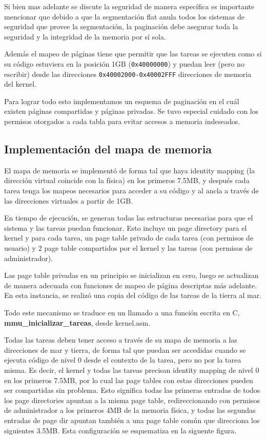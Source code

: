 	Si bien mas adelante se discute la seguridad de manera específica 
es importante mencionar que debido a que la segmentación flat anula 
todos los sistemas de seguridad que provee la segmentación, la paginación debe asegurar 
toda la seguridad y la integridad de la memoria por sí sola.

	Además el mapeo de páginas tiene que permitir que las tareas
se ejecuten como si su código estuviera en la posición 1GB (\texttt{0x40000000})
y puedan leer (pero no escribir) desde las direcciones \texttt{0x40002000-0x40002FFF}
direcciones de memoria del kernel.

	Para lograr todo esto implementamos un esquema de paginación en el cuál
existen páginas compartidas y páginas privadas. Se tuvo especial
cuidado con los permisos otorgados a cada tabla para evitar accesos a memoria
indeseados.

\subsection{Implementación del mapa de memoria}
	
	El mapa de memoria se implementó de forma tal que haya identity mapping 
(la dirección virtual coincide con la física) en los primeros 7.5MB, y después 
cada tarea tenga los mapeos necesarios para acceder a su código y al ancla a través
de las direcciones virtuales a partir de 1GB.
	
	En tiempo de ejecución, se generan todas las estructuras necesarias
para que el sistema y las tareas puedan funcionar. Esto incluye un page directory para 
el kernel y para cada tarea, un page table privado de cada tarea (con
permisos de usuario) y 2 page table compartidos por el kernel y las tareas (con 
permisos de administrador).

	Las page table privadas en un principio se inicializan en cero, luego
se actualizan de manera adecuada con funciones de mapeo de página descriptas 
más adelante. En esta instancia, se realizó una copia del código de las tareas 
de la tierra al mar.

	Todo este mecanismo se traduce en un llamado a una función escrita en C, 
\textbf{mmu\_inicializar\_tareas}, desde kernel.asm.

	Todas las tareas deben tener acceso a través de su mapa de memoria a las direcciones
de mar y tierra, de forma tal que puedan ser accedidas cuando se ejecuta código de nivel 0 desde
el contexto de la tarea, pero no por la tarea misma. Es decir, el kernel y todas las tareas precisan 
identity mapping de nivel 0 en los primeros 7.5MB, por lo cual las page tables con estas direcciones 
pueden ser compartidas sin problema. Esto significa todas las primeras entradas de todos los 
page directories apuntan a la misma page table, redireccionando con permisos de administrador
a los primeros 4MB de la memoria física, y todas las segundas entradas de page dir apuntan 
también a una page table común que direcciona los siguientes 3.5MB. Esta configuración se 
esquematiza en la siguente figura.


